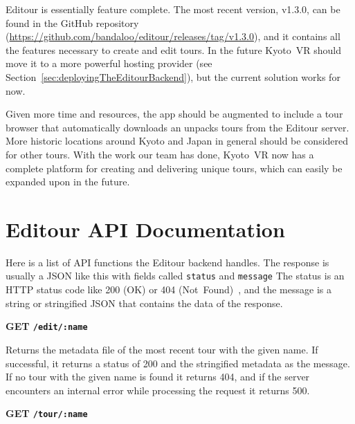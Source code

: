 \documentclass[a4paper, 10pt, american, titlepage]{article}
\newenvironment{indented}[1]%
{\begin{list}{}%
	{\setlength{\leftmargin}{#1}}%
	\item[]%
}
{\end{list}}
\begin{document}
Editour is essentially feature complete. The most recent version, v1.3.0, can be
found in the GitHub repository
(\url{https://github.com/bandaloo/editour/releases/tag/v1.3.0}), and it contains
all the features necessary to create and edit tours. In the future Kyoto~VR
should move it to a more powerful hosting provider (see
Section~\ref{sec:deployingTheEditourBackend}), but the current solution works
for now.

Given more time and resources, the app should be augmented to include a tour
browser that automatically downloads an unpacks tours from the Editour server.
More historic locations around Kyoto and Japan in general should be considered
for other tours. With the work our team has done, Kyoto~VR now has a complete
platform for creating and delivering unique tours, which can easily be expanded
upon in the future.

\clearpage %

\begin{singlespace}
	\printbibliography
\end{singlespace}

\clearpage

\appendices
\section{Editour API Documentation}
\label{sec:editourAPIDocumentation}

Here is a list of API functions the Editour backend handles. The response is
usually a JSON like this with fields called \texttt{status} and \texttt{message}
The status is an HTTP status code like 200 (OK) or 404
(Not~Found)~\autocite{rfc7231}, and the message is a string or stringified JSON
that contains the data of the response.

\noindent\textbf{GET \texttt{/edit/:name}}

\begin{indented}{1cm}
	Returns the metadata file of the most recent tour with the given name. If
	successful, it returns a status of 200 and the stringified metadata as the
	message. If no tour with the given name is found it returns 404, and if the
	server encounters an internal error while processing the request it returns
	500.
\end{indented}

\noindent\textbf{GET \texttt{/tour/:name}}
\end{document}
